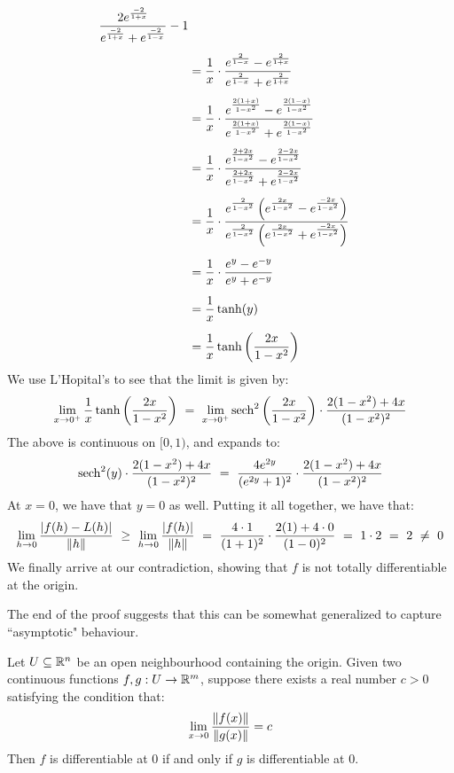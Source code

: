 \begin{pf}
\begin{align*}
        \frac{2e^{\frac{-2}{1+x}}}{e^{\frac{-2}{1+x}} + e^{\frac{-2}{1-x}}} - 1
        \vsp
        & = \frac{1}{x} \cdot \frac{e^{\frac{2}{1-x}}
        - e^{\frac{2}{1+x}}} {e^{\frac{2}{1-x}} + e^{\frac{2}{1+x}}} \vsp
        & = \frac{1}{x} \cdot \frac{e^{\frac{2(1+x)}{1-x^{2}}}
        - e^{\frac{2(1-x)}{1-x^{2}}}}
        {e^{\frac{2(1+x)}{1-x^{2}}} + e^{\frac{2(1-x)}{1-x^{2}}}} \vsp
        & = \frac{1}{x} \cdot \frac{e^{\frac{2+2x}{1-x^{2}}}
        - e^{\frac{2-2x}{1-x^{2}}}} {e^{\frac{2+2x}{1-x^{2}}}
        + e^{\frac{2-2x}{1-x^{2}}}} \vsp
        & = \frac{1}{x} \cdot \frac{e^{\frac{2}{1-x^{2}}}
        \left( e^{\frac{2x}{1-x^{2}}} - e^{\frac{-2x}{1-x^{2}}} \right)}
        {e^{\frac{2}{1-x^{2}}}\left( e^{\frac{2x}{1-x^{2}}}
        + e^{\frac{-2x}{1-x^{2}}} \right)} \vsp
        & = \frac{1}{x} \cdot \frac{e^{y} - e^{-y}}{e^{y} + e^{-y}} \vsp
        & = \frac{1}{x} \tanh(y) \vsp
        & = \frac{1}{x} \tanh \left( \frac{2x}{1-x^{2}} \right)
    \end{align*}
    We use L'Hopital's to see that the limit is given by:
    \begin{equation*}
        \lim_{x \rightarrow 0^{+}} \frac{1}{x}\tanh
        \left( \frac{2x}{1-x^{2}} \right)
        \ = \ \lim_{x \rightarrow 0^{+}} \sech^{2}
        \left( \frac{2x}{1-x^{2}} \right) \cdot
        \frac{2(1-x^{2}) + 4x}{(1-x^{2})^{2}}
    \end{equation*}
    The above is continuous on $ [0, 1) $, and expands to:
    \begin{equation*}
        \sech^{2}(y) \cdot \frac{2(1-x^{2}) + 4x}{(1-x^{2})^{2}}
        \ = \ \frac{4e^{2y}}{(e^{2y} +1)^{2}} \cdot \frac{2(1-x^{2}) + 4x}
        {(1-x^{2})^{2}}
    \end{equation*}
    At $ x = 0 $, we have that $ y = 0 $ as well. Putting it all together, we
    have that:
    \begin{equation*}
        \lim_{h\rightarrow0} \frac{\abs{f(h) - L(h)}}{\left\|h\right\|}
        \ \geq \ \lim_{h\rightarrow0} \frac{\abs{f(h)}}{\left\|h\right\|}
        \ = \ \frac{4 \cdot 1}{(1 + 1)^{2}} \cdot \frac{2(1) + 4 \cdot 0}
        {(1 - 0)^{2}} \ = \ 1 \cdot 2 \ = \ 2 \ \neq \ 0
    \end{equation*}
    We finally arrive at our contradiction, showing that $ f $ is not totally
    differentiable at the origin.
\end{pf} \vspace{-2mm}
The end of the proof suggests that this can be somewhat generalized to capture
``asymptotic" behaviour.
\begin{lm}[type=Conjecture.]
    Let $ U \subseteq \mathbb{R}^{n} $ be an open neighbourhood containing
    the origin. Given two continuous functions $ f, g : U \rightarrow \mathbb{R}^{m}
    $, suppose there exists a real number $ c > 0 $ satisfying the condition
    that: \vspace{-1mm}
    \begin{equation*}
        \lim_{x \rightarrow 0}\frac{\left\|f(x)\right\|}{\left\|g(x)\right\|} = c
    \end{equation*}
    Then $ f $ is differentiable at $ 0 $ if and only if $ g $ is differentiable
    at $ 0 $.
\end{lm}

